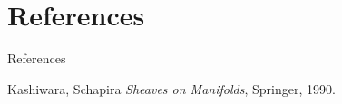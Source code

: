 \documentclass[dvipdfmx,12pt,aspectratio=169,leqno]{beamer}%
\numberwithin{equation}{subsection}
\theoremstyle{mystyle}
\begin{document}
\begin{comment}
    \begin{frame}\frametitle{同値関係の幾何的イメージ}
    \begin{tikzpicture}
        \draw[>=stealth,semithick] (-2,0)--(3,0); %
        \draw[>=stealth,semithick] (0,-2)--(0,4); %
        \draw (0,0)node[below right]{O}; %
        \draw[thick, domain=-2:3] plot(\x,{0.5*\x});
        \draw[thick, domain=-1.:2] plot(\x,2*\x);
        \fill[black!20] (1.5,3) rectangle (2.5,1.25); %
        \draw[line width = 0.5pt] (1.5,3) rectangle (2.5,1.25); %
        \draw (2.5,1.25)node[below]{$2U$}; %
        \fill[black!20] (1,2) rectangle (1.66,0.83); %
        \draw[line width = 0.5pt] (1,2) rectangle (1.66,0.83); %
        \fill[black!40] (0.75,1.5) rectangle (1.25,0.625); %
        \draw[line width = 0.5pt] (0.75,1.5) rectangle (1.25,0.625); %
        \draw (0.75,1.5)node[left]{$U$}; %
        \fill[black!20] (-0.75,-1.5) rectangle (-1.25,-0.625); %
        \draw[line width = 0.5pt] (-0.75,-1.5) rectangle (-1.25,-0.625); %
        \fill[black!20] (-1,-2) rectangle (-1.66,-0.83); %
        \draw[line width = 0.5pt] (-1,-2) rectangle (-1.66,-0.83); %
        \draw (-0.75,-1.5)node[right]{$-U$}; %
        \fill[black!20] (0.375,0.75) rectangle (0.625,0.3125); %
        \draw[line width = 0.5pt] (0.375,0.75) rectangle (0.625,0.3125); %
        \draw (0.625,0.2)node[right]{$(1/2)U$}; %
        \draw[very thick, domain=-2.:3] plot(\x,{0.8*\x});
        \draw (1.8,3.6)node[right]{$U$を通る直線の上端};
        \draw (3,2.4)node[right]{$U$を通る直線};
        \draw (3,1.5)node[right]{$U$を通る直線の下端};
    \end{tikzpicture}
    \centering
\end{frame}

\end{comment}

\section{References}

\begin{frame}[allowframebreaks]{References}
    \begin{thebibliography}{KS90}\beamertemplatetextbibitems
         Kashiwara, Schapira 
        \textit{Sheaves on Manifolds}, Springer, 1990.
    \end{thebibliography}
\end{frame}

\begin{comment}
\begin{frame}[noframenumbering]
aaa
\end{frame}
\end{comment}
\end{document}
